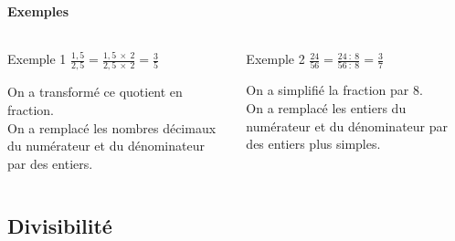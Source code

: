 \documentclass{beamer}
\begin{document}
\begin{frame}
	\frametitle{}  
	\framesubtitle{Exemples}	
	
	
	\begin{columns}[onlytextwidth]
		\begin{column}{0.465\textwidth}
			\begin{exampleblock}{Exemple 1}
				{\LARGE $\frac{1,5}{2,5} = \frac{1,5 \: \times  \: 2}{2,5 \: \times \: 2} = \frac{3}{5}$} 
				\vspace*{5mm}
				
				On a transformé ce quotient en fraction.\\
				
				On a remplacé les nombres décimaux du numérateur et du dénominateur par des entiers.\pause
			\end{exampleblock}
		\end{column}
		\begin{column}{0.465\textwidth}
			\begin{exampleblock}{Exemple 2}
				{\LARGE $\frac{24}{56} = \frac{24 \: :  \: 8}{56 \: : \: 8} = \frac{3}{7}$} 
				\vspace*{5mm}
				
				On a simplifié la fraction par 8.\\
				
				On a remplacé les entiers du numérateur et du dénominateur par des entiers plus simples.
			\end{exampleblock}
		\end{column}
	\end{columns}
	
	
	
\end{frame}

\subsection{Divisibilité}
\end{document}
